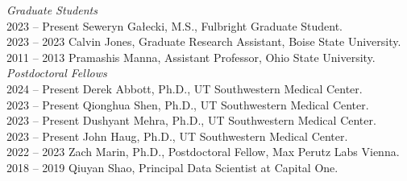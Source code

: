 \textit{Graduate Students} \\
2023 -- Present \hspace{14pt} Seweryn Gałecki, M.S., Fulbright Graduate Student. \\
2023 -- 2023 \hspace{28pt} Calvin Jones, Graduate Research Assistant, Boise State University. \\
2011 -- 2013 \hspace{28pt} Pramashis Manna, Assistant Professor, Ohio State University. \\

\textit{Postdoctoral Fellows} \\
2024 -- Present \hspace{14pt} Derek Abbott, Ph.D., UT Southwestern Medical Center. \\
2023 -- Present \hspace{14pt} Qionghua Shen, Ph.D., UT Southwestern Medical Center. \\
2023 -- Present \hspace{14pt} Dushyant Mehra, Ph.D., UT Southwestern Medical Center. \\
2023 -- Present \hspace{14pt} John Haug, Ph.D., UT Southwestern Medical Center. \\
2022 -- 2023 \hspace{28pt} Zach Marin, Ph.D., Postdoctoral Fellow, Max Perutz Labs Vienna. \\
2018 -- 2019 \hspace{28pt} Qiuyan Shao, Principal Data Scientist at Capital One. \\

